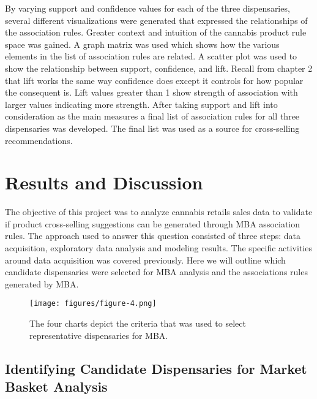 \documentclass[../article.tex, 12pt]{subfiles}
\begin{document}
\begin{multicols*}{2}
\par
By varying support and confidence values for each of the three dispensaries, several different visualizations were generated that expressed the relationships of the association rules. Greater context and intuition of the cannabis product rule space was gained. A graph matrix was used which shows how the various elements in the list of association rules are related. A scatter plot was used to show the relationship between support, confidence, and lift. Recall from chapter 2 that lift works the same way confidence does except it controls for how popular the consequent is. Lift values greater than 1 show strength of association with larger values indicating more strength. After taking support and lift into consideration as the main measures a final list of association rules for all three dispensaries was developed. The final list was used as a source for cross-selling recommendations.

\section{Results and Discussion}
\label{sec:results-and-discussion}

The objective of this project was to analyze cannabis retails sales data to validate if product cross-selling suggestions can be generated through MBA association rules. The approach used to answer this question consisted of three steps: data acquisition, exploratory data analysis and modeling results. The specific activities around data acquisition was covered previously. Here we will outline which candidate dispensaries were selected for MBA analysis and the associations rules generated by MBA.

\begin{figure*}
\texttt{[image: figures/figure-4.png]}
\captionsetup{margin=.1\linewidth}
\caption{The four charts depict the criteria that was used to select representative dispensaries for MBA.}
\label{fig:4}
\end{figure*}

\subsection{Identifying Candidate Dispensaries for Market Basket Analysis}


\end{multicols*}
\end{document}
